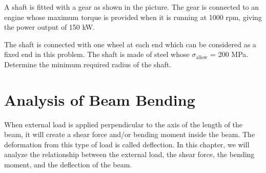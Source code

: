 \documentclass[
10pt,
a4paper,
openany,
svgnames,
]{book} %
\begin{document}
\begin{exercises}
\item  A shaft is fitted with a gear as shown in the picture. The gear is connected to an engine whose maximum torque is provided when it is running at 1000 rpm, giving the power output of 150 kW.


  The shaft is connected with one wheel at each end which can be considered as a fixed end in this problem. The shaft is made of steel whose $\sigma_{\text{allow}}$ = 200 MPa. Determine the minimum required radius of the shaft.

  \begin{figure}[H]
    \centering
    \centering
  \end{figure}
\end{exercises}


\chapter{Analysis of Beam Bending}

When external load is applied perpendicular to the axis of the length of the beam, it will create a shear force and/or bending moment inside the beam. The deformation from this type of load is called deflection. In this chapter, we will analyze the relationship between the external load, the shear force, the bending moment, and the deflection of the beam.
\end{document}
